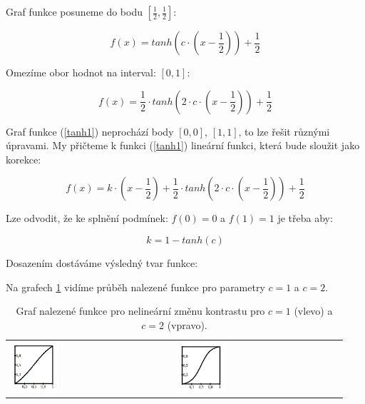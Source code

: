 Graf funkce posuneme do bodu  $[\frac{1}{2},\frac{1}{2}]$:

\begin{equation}
f(x) = tanh(c\cdot(x-\frac{1}{2})) + \frac{1}{2}
\end{equation}

Omezíme obor hodnot na interval: $[0,1]$:

\begin{equation} \label{tanh1}
f(x) = \frac{1}{2}\cdot tanh(2\cdot c\cdot(x-\frac{1}{2})) + \frac{1}{2}
\end{equation}

Graf funkce (\ref{tanh1}) neprochází body $[0,0]$, $[1,1]$, to lze řešit různými úpravami. My přičteme k funkci (\ref{tanh1}) lineární funkci, která bude sloužit jako korekce:

\begin{equation}
f(x) = k\cdot(x-\frac{1}{2}) + \frac{1}{2}\cdot tanh(2\cdot c\cdot(x-\frac{1}{2})) + \frac{1}{2}
\end{equation}

Lze odvodit, že ke splnění podmínek: $f(0)=0$ a $f(1)=1$ je třeba aby:

\begin{equation}
k = 1 - tanh(c)
\end{equation}

Dosazením dostáváme výsledný tvar funkce:

\begin{center}
\end{center}

Na grafech \ref{table:tanh} vidíme průběh nalezené funkce pro parametry $c=1$ a $c=2$.


\noindent
\begin{table}[ht]
	\captionsetup{tablename=Grafy}
	\caption{Graf nalezené funkce pro nelineární změnu kontrastu pro $c=1$ (vlevo) a $c=2$ (vpravo).}
	\label{table:tanh}
	\centering
		\begin{tabular}{p{}p{}}
			\includegraphics[width=0.3\textwidth,height=0.3\textwidth]{Text/IMG/nelinearni1.jpg}
		&
			\includegraphics[width=0.3\textwidth,height=0.3\textwidth]{Text/IMG/nelinearni2.jpg}
		\end{tabular}
\end{table}


